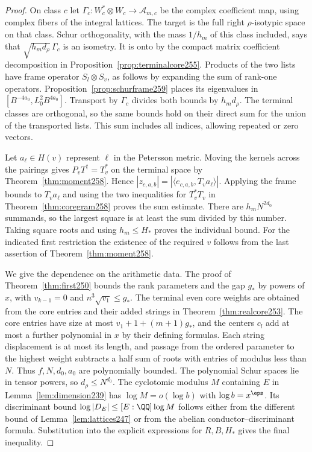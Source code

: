 \documentclass[a4paper,11pt]{article}
\theoremstyle{definition}
\theoremstyle{remark}
\numberwithin{equation}{section}
\begin{document}
\begin{proof}
On class \(c\) let \(\Gamma_c:W_c^*\otimes W_c\longrightarrow
\mathcal A_{m,c}\) be the complex coefficient map, using complex
fibers of the integral lattices. The target is the full right
\(\rho\)-isotypic space on that class. Schur orthogonality, with
the mass \(1/h_m\) of this class included, says that
\(\sqrt{h_m d_\rho}\,\Gamma_c\) is an isometry. It is onto by
the compact matrix coefficient decomposition in
Proposition~\ref{prop:terminalcore255}. Products of the two lists
have frame operator \(S_l\otimes S_v\), as follows by expanding
the sum of rank-one operators. Proposition~\ref{prop:schurframe259}
places its eigenvalues in \([B^{-4a_0},L_0^2B^{4a_0}]\).
Transport by \(\Gamma_c\) divides both bounds by \(h_m d_\rho\).
The terminal classes are orthogonal, so the same bounds hold
on their direct sum for the union of the transported lists.
This sum includes all indices, allowing repeated or zero vectors.

Let \(a_\ell\in H(v)\) represent \(\ell\) in the Petersson
metric. Moving the kernels across the pairings gives
\(P_vT^\dagger=T_v^*\) on the terminal space by
Theorem~\ref{thm:moment258}. Hence
\(|z_{c,a,b}|=|\langle e_{c,a,b},T_va_\ell\rangle|\).
Applying the frame bounds to \(T_va_\ell\) and using the
two inequalities for \(T_v^*T_v\) in Theorem~\ref{thm:coregram258}
proves the sum estimate. There are \(h_m N^{2d_0}\) summands,
so the largest square is at least the sum divided by this
number. Taking square roots and using \(h_m\le H_*\) proves the
individual bound. For the indicated first restriction the
existence of the required \(v\) follows from the last assertion
of Theorem~\ref{thm:moment258}.

We give the dependence on the arithmetic data. The proof of
Theorem~\ref{thm:first250} bounds the rank parameters and the
gap \(g_*\) by powers of \(x\), with \(v_{k-1}=0\) and
\(n^3\sqrt{v_1}\le g_*\). The terminal even core weights
are obtained from the core entries and their added strings in
Theorem~\ref{thm:realcore253}. The core entries have size
at most \(v_1+1+(m+1)g_*\), and the centers \(c_l\) add at
most a further polynomial in \(x\) by their defining formulas.
Each string displacement is at most its length, and passage from
the ordered parameter to the highest weight subtracts a half
sum of roots with entries of modulus less than \(N\). Thus
\(f,N,d_0,a_0\) are polynomially bounded. The polynomial Schur
spaces lie in tensor powers, so \(d_\rho\le N^{d_0}\). The
cyclotomic modulus \(M\) containing \(E\) in
Lemma~\ref{lem:dimension239} has \(\log M=o(\log b)\) with
\(\log b=x^\eps\). Its discriminant bound
\(\log |D_E|\le [E:\QQ]\log M\) follows either from the different
bound of Lemma~\ref{lem:lattices247} or from the abelian
conductor--discriminant formula. Substitution into the explicit
expressions for \(R,B,H_*\) gives the final inequality.
\end{proof}
\end{document}
